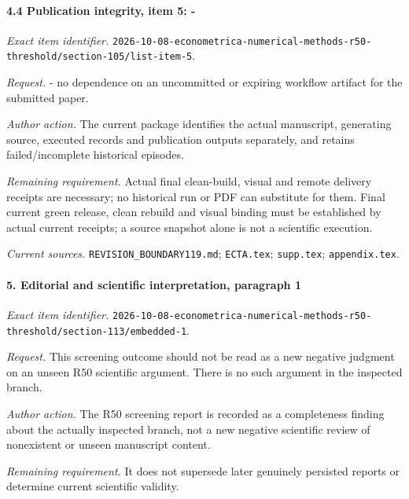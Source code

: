 \paragraph{4.4 Publication integrity, item 5: -}

\emph{Exact item identifier.} \nolinkurl{2026-10-08-econometrica-numerical-methods-r50-threshold/section-105/list-item-5}.

\par\emph{Request.} - no dependence on an uncommitted or expiring workflow artifact for the submitted paper.

\par\emph{Author action.} The current package identifies the actual manuscript, generating source, executed records and publication outputs separately, and retains failed/\allowbreak{}incomplete historical episodes.

\par\emph{Remaining requirement.} Actual final clean-build, visual and remote delivery receipts are necessary; no historical run or PDF can substitute for them. Final current green release, clean rebuild and visual binding must be established by actual current receipts; a source snapshot alone is not a scientific execution.

\par\emph{Current sources.} \nolinkurl{REVISION_BOUNDARY119.md}; \nolinkurl{ECTA.tex}; \nolinkurl{supp.tex}; \nolinkurl{appendix.tex}.

\paragraph{5. Editorial and scientific interpretation, paragraph 1}

\emph{Exact item identifier.} \nolinkurl{2026-10-08-econometrica-numerical-methods-r50-threshold/section-113/embedded-1}.

\par\emph{Request.} This screening outcome should not be read as a new negative judgment on an unseen R50 scientific argument. There is no such argument in the inspected branch.

\par\emph{Author action.} The R50 screening report is recorded as a completeness finding about the actually inspected branch, not a new negative scientific review of nonexistent or unseen manuscript content.

\par\emph{Remaining requirement.} It does not supersede later genuinely persisted reports or determine current scientific validity.

